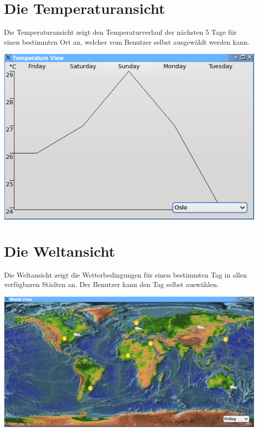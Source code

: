 \documentclass[11pt,a4paper]{scrreprt}
\begin{document}
\section{Die Temperaturansicht}
Die Temperaturansicht zeigt den Temperaturverlauf der nächsten 5 Tage
für einen bestimmten Ort an, welcher vom Benutzer selbst ausgewählt
werden kann.

\begin{center}
\includegraphics[width=14cm]{temperatureview.png}
\end{center}

\section{Die Weltansicht}
Die Weltansicht zeigt die Wetterbedingungen für einen bestimmten Tag
in allen verfügbaren Städten an. Der Benutzer kann den Tag selbst
auswählen.

\begin{center}
\includegraphics[width=14cm]{worldview.png}
\end{center}
\end{document}
